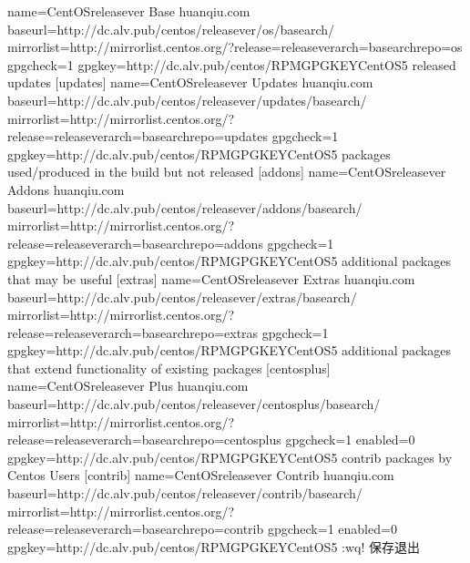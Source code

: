 \documentclass[letterpaper,10pt,english]{sphinxmanual}
\begin{document}
\begin{sphinxVerbatim}[commandchars=\\\{\}]
[base]
name=CentOS\PYGZhy{}\PYGZdl{}releasever \PYGZhy{} Base \PYGZhy{} huanqiu.com
baseurl=http://dc.alv.pub/centos/\PYGZdl{}releasever/os/\PYGZdl{}basearch/
\PYGZsh{}mirrorlist=http://mirrorlist.centos.org/?release=\PYGZdl{}releasever\PYGZam{}arch=\PYGZdl{}basearch\PYGZam{}repo=os
gpgcheck=1
gpgkey=http://dc.alv.pub/centos/RPM\PYGZhy{}GPG\PYGZhy{}KEY\PYGZhy{}CentOS\PYGZhy{}5
\PYGZsh{}released updates
[updates]
name=CentOS\PYGZhy{}\PYGZdl{}releasever \PYGZhy{} Updates \PYGZhy{} huanqiu.com
baseurl=http://dc.alv.pub/centos/\PYGZdl{}releasever/updates/\PYGZdl{}basearch/
\PYGZsh{}mirrorlist=http://mirrorlist.centos.org/?release=\PYGZdl{}releasever\PYGZam{}arch=\PYGZdl{}basearch\PYGZam{}repo=updates
gpgcheck=1
gpgkey=http://dc.alv.pub/centos/RPM\PYGZhy{}GPG\PYGZhy{}KEY\PYGZhy{}CentOS\PYGZhy{}5
\PYGZsh{}packages used/produced in the build but not released
[addons]
name=CentOS\PYGZhy{}\PYGZdl{}releasever \PYGZhy{} Addons \PYGZhy{} huanqiu.com
baseurl=http://dc.alv.pub/centos/\PYGZdl{}releasever/addons/\PYGZdl{}basearch/
\PYGZsh{}mirrorlist=http://mirrorlist.centos.org/?release=\PYGZdl{}releasever\PYGZam{}arch=\PYGZdl{}basearch\PYGZam{}repo=addons
gpgcheck=1
gpgkey=http://dc.alv.pub/centos/RPM\PYGZhy{}GPG\PYGZhy{}KEY\PYGZhy{}CentOS\PYGZhy{}5
\PYGZsh{}additional packages that may be useful
[extras]
name=CentOS\PYGZhy{}\PYGZdl{}releasever \PYGZhy{} Extras \PYGZhy{} huanqiu.com
baseurl=http://dc.alv.pub/centos/\PYGZdl{}releasever/extras/\PYGZdl{}basearch/
\PYGZsh{}mirrorlist=http://mirrorlist.centos.org/?release=\PYGZdl{}releasever\PYGZam{}arch=\PYGZdl{}basearch\PYGZam{}repo=extras
gpgcheck=1
gpgkey=http://dc.alv.pub/centos/RPM\PYGZhy{}GPG\PYGZhy{}KEY\PYGZhy{}CentOS\PYGZhy{}5
\PYGZsh{}additional packages that extend functionality of existing packages
[centosplus]
name=CentOS\PYGZhy{}\PYGZdl{}releasever \PYGZhy{} Plus \PYGZhy{} huanqiu.com
baseurl=http://dc.alv.pub/centos/\PYGZdl{}releasever/centosplus/\PYGZdl{}basearch/
\PYGZsh{}mirrorlist=http://mirrorlist.centos.org/?release=\PYGZdl{}releasever\PYGZam{}arch=\PYGZdl{}basearch\PYGZam{}repo=centosplus
gpgcheck=1
enabled=0
gpgkey=http://dc.alv.pub/centos/RPM\PYGZhy{}GPG\PYGZhy{}KEY\PYGZhy{}CentOS\PYGZhy{}5
\PYGZsh{}contrib \PYGZhy{} packages by Centos Users
[contrib]
name=CentOS\PYGZhy{}\PYGZdl{}releasever \PYGZhy{} Contrib \PYGZhy{} huanqiu.com
baseurl=http://dc.alv.pub/centos/\PYGZdl{}releasever/contrib/\PYGZdl{}basearch/
\PYGZsh{}mirrorlist=http://mirrorlist.centos.org/?release=\PYGZdl{}releasever\PYGZam{}arch=\PYGZdl{}basearch\PYGZam{}repo=contrib
gpgcheck=1
enabled=0
gpgkey=http://dc.alv.pub/centos/RPM\PYGZhy{}GPG\PYGZhy{}KEY\PYGZhy{}CentOS\PYGZhy{}5
:wq! \PYGZsh{}保存退出
\end{sphinxVerbatim}
\end{document}
